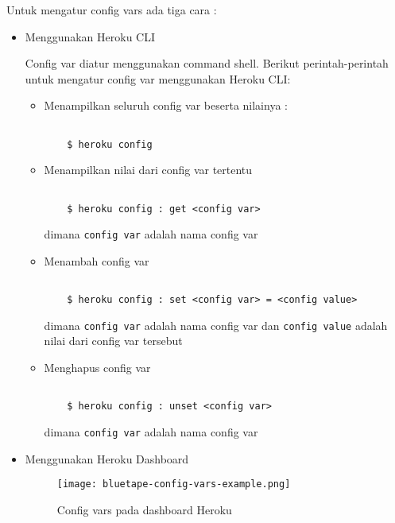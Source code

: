 Untuk mengatur config vars ada tiga cara : 
\begin{itemize}
\item Menggunakan Heroku CLI

Config var diatur menggunakan command shell. Berikut perintah-perintah untuk mengatur config var menggunakan Heroku CLI:
\begin{itemize}
\item Menampilkan seluruh config var beserta nilainya : 

\begin{lstlisting}

	$ heroku config

\end{lstlisting}

\item Menampilkan nilai dari config var tertentu 
\begin{lstlisting}

	$ heroku config : get <config var>

\end{lstlisting}
dimana \texttt{config var} adalah nama config var

\item Menambah config var

\begin{lstlisting}

	$ heroku config : set <config var> = <config value>

\end{lstlisting}
dimana \texttt{config var} adalah nama config var dan \texttt{config value} adalah nilai dari config var tersebut

\item Menghapus config var

\begin{lstlisting}

	$ heroku config : unset <config var>

\end{lstlisting}
dimana \texttt{config var} adalah nama config var

\end{itemize}

\item Menggunakan Heroku Dashboard

\begin{figure}[H]
	\centering  
	\texttt{[image: bluetape-config-vars-example.png]}  
	\caption[Config vars pada dashboard Heroku]{Config vars pada dashboard Heroku} 
	\label{fig:bluetape-config-vars-example} 
\end{figure}


\end{itemize}
